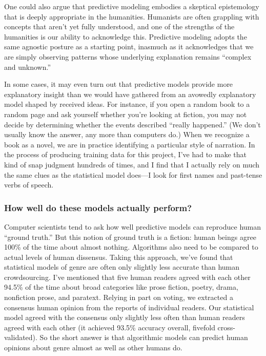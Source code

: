 \documentclass[paper=a4, fontsize=12pt]{scrartcl}
\numberwithin{equation}{section}		%
\numberwithin{figure}{section}			%
\numberwithin{table}{section}				%
\begin{document}
One could also argue that predictive modeling embodies a skeptical epistemology that is deeply appropriate in the humanities. Humanists are often grappling with concepts that aren't yet fully understood, and one of the strengths of the humanities is our ability to acknowledge this. Predictive modeling adopts the same agnostic posture as a starting point, inasmuch as it acknowledges that we are simply observing patterns whose underlying explanation remains ``complex and unknown.''

In some cases, it may even turn out that predictive models provide more explanatory insight than we would have gathered from an avowedly explanatory model shaped by received ideas. For instance, if you open a random book to a random page and ask yourself whether you're looking at fiction, you may not decide by determining whether the events described ``really happened.'' (We don't usually know the answer, any more than computers do.) When we recognize a book as a novel, we are in practice identifying a particular style of narration. In the process of producing training data for this project, I've had to make that kind of snap judgment hundreds of times, and I find that I actually rely on much the same clues as the statistical model does---I look for first names and past-tense verbs of speech.

\subsubsection{How well do these models actually perform?}

Computer scientists tend to ask how well predictive models can reproduce human ``ground truth.'' But this notion of ground truth is a fiction: human beings agree 100\% of the time about almost nothing. Algorithms also need to be compared to actual levels of human dissensus. Taking this approach, we've found that statistical models of genre are often only slightly less accurate than human crowdsourcing. I've mentioned that five human readers agreed with each other 94.5\% of the time about broad categories like prose fiction, poetry, drama, nonfiction prose, and paratext. Relying in part on voting, we extracted a consensus human opinion from the reports of individual readers. Our statistical model agreed with the consensus only slightly less often than human readers agreed with each other (it achieved 93.5\% accuracy overall, fivefold cross-validated). So the short answer is that algorithmic models can predict human opinions about genre almost as well as other humans do.
\end{document}
